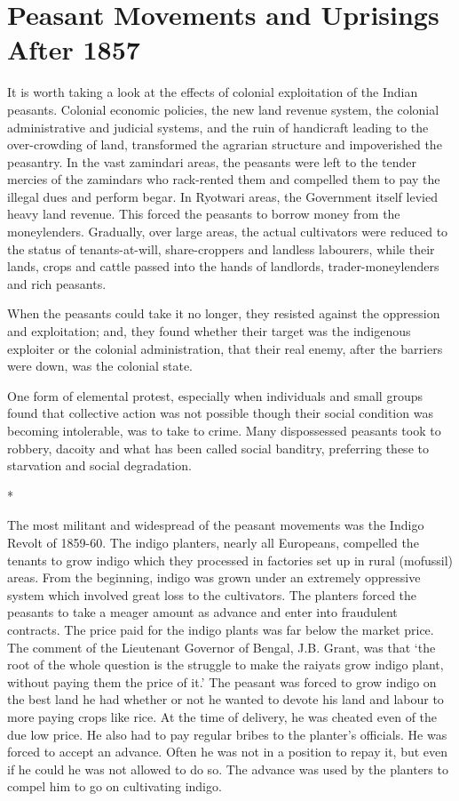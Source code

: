 \chapter{Peasant Movements and Uprisings After 1857}

It is worth taking a look at the effects of colonial exploitation of the Indian peasants. Colonial economic policies, the new land revenue system, the colonial administrative and judicial systems, and the ruin of handicraft leading to the over-crowding of land, transformed the agrarian structure and impoverished the peasantry. In the vast zamindari areas, the peasants were left to the tender mercies of the zamindars who rack-rented them and compelled them to pay the illegal dues and perform begar. In Ryotwari areas, the Government itself levied heavy land revenue. This forced the peasants to borrow money from the moneylenders. Gradually, over large areas, the actual cultivators were reduced to the status of tenants-at-will, share-croppers and landless labourers, while their lands, crops and cattle passed into the hands of landlords, trader-moneylenders and rich peasants.

When the peasants could take it no longer, they resisted against the oppression and exploitation; and, they found whether their target was the indigenous exploiter or the colonial administration, that their real enemy, after the barriers were down, was the colonial state.

One form of elemental protest, especially when individuals and small groups found that collective action was not possible though their social condition was becoming intolerable, was to take to crime. Many dispossessed peasants took to robbery, dacoity and what has been called social banditry, preferring these to starvation and social degradation.

\begin{center}*\end{center}

The most militant and widespread of the peasant movements was the Indigo Revolt of 1859-60. The indigo planters, nearly all Europeans, compelled the tenants to grow indigo which they processed in factories set up in rural (mofussil) areas. From the beginning, indigo was grown under an extremely oppressive system which involved great loss to the cultivators. The planters forced the peasants to take a meager amount as advance and enter into fraudulent contracts. The price paid for the indigo plants was far below the market price. The comment of the Lieutenant Governor of Bengal, J.B. Grant, was that ‘the root of the whole question is the struggle to make the raiyats grow indigo plant, without paying them the price of it.’ The peasant was forced to grow indigo on the best land he had whether or not he wanted to devote his land and labour to more paying crops like rice. At the time of delivery, he was cheated even of the due low price. He also had to pay regular bribes to the planter’s officials. He was forced to accept an advance. Often he was not in a position to repay it, but even if he could he was not allowed to do so. The advance was used by the planters to compel him to go on cultivating indigo.


